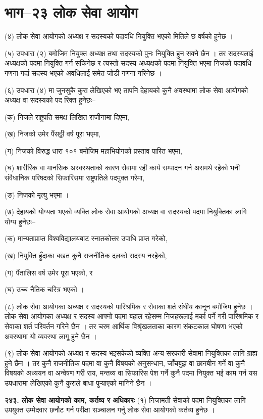 \section{भाग–२३ लोक सेवा आयोग}

(४) लोक सेवा आयोगको अध्यक्ष र सदस्यको पदावधि नियुक्ति भएको मितिले छ वर्षको हुनेछ ।

(५) उपधारा (२) बमोजिम नियुक्त अध्यक्ष तथा सदस्यको पुनः नियुक्ति हुन सक्ने छैन ।
तर सदस्यलाई अध्यक्षको पदमा नियुक्ति गर्न सकिनेछ र त्यस्तो सदस्य अध्यक्षको पदमा नियुक्ति भएमा निजको पदावधि गणना गर्दा सदस्य भएको अवधिलाई समेत जोडी गणना गरिनेछ ।

(६) उपधारा (४) मा जुनसुकै कुरा लेखिएको भए तापनि देहायको कुनै अवस्थामा लोक सेवा आयोगको अध्यक्ष वा सदस्यको पद रिक्त हुनेछः–

(क) निजले राष्ट्रपति समक्ष लिखित राजीनामा दिएमा,

(ख) निजको उमेर पैंसठ्ठी वर्ष पूरा भएमा,

(ग) निजको विरुद्ध धारा १०१ बमोजिम महाभियोगको प्रस्ताव पारित भएमा,

(घ) शारीरिक वा मानसिक अस्वस्थताको कारण सेवामा रही कार्य सम्पादन गर्न असमर्थ रहेको भनी संवैधानिक परिषदको सिफारिसमा राष्ट्रपतिले पदमुक्त गरेमा,

(ङ) निजको मृत्यु भएमा ।

(७) देहायको योग्यता भएको व्यक्ति लोक सेवा आयोगको अध्यक्ष वा सदस्यको पदमा नियुक्तिका लागि योग्य हुनेछः–

(क) मान्यताप्राप्त विश्वविद्यालयबाट स्नातकोत्तर उपाधि प्राप्त गरेको,

(ख) नियुक्ति हुँदाका बखत कुनै राजनीतिक दलको सदस्य नरहेको,

(ग) पैंतालिस वर्ष उमेर पूरा भएको, र

(घ) उच्च नैतिक चरित्र भएको ।

(८) लोक सेवा आयोगका अध्यक्ष र सदस्यको पारिश्रमिक र सेवाका शर्त संघीय कानून बमोजिम हुनेछ । लोक सेवा आयोगका अध्यक्ष र सदस्य आफ्नो पदमा बहाल रहेसम्म निजहरूलाई मर्का पर्ने गरी पारिश्रमिक र सेवाका शर्त परिवर्तन गरिने छैन ।
तर चरम आर्थिक विश्रृंखलताका कारण संकटकाल घोषणा भएको अवस्थामा यो व्यवस्था लागू हुने छैन ।

(९) लोक सेवा आयोगको अध्यक्ष र सदस्य भइसकेको व्यक्ति अन्य सरकारी सेवामा नियुक्तिका लागि ग्राह्य हुने छैन ।
तर कुनै राजनीतिक पदमा वा कुनै विषयको अनुसन्धान, जाँचबुझ वा छानबीन गर्ने वा कुनै विषयको अध्ययन वा अन्वेषण गरी राय, मन्तव्य वा सिफारिस पेश गर्ने कुनै पदमा नियुक्त भई काम गर्न यस उपधारामा लेखिएको कुनै कुराले बाधा पुर्‍याएको मानिने छैन ।

\textbf{२४३. लोक सेवा आयोगको काम, कर्तव्य र अधिकारः} (१) निजामती सेवाको पदमा नियुक्तिका लागि उपयुक्त उम्मेदवार छनौट गर्न परीक्षा सञ्चालन गर्नु लोक सेवा आयोगको कर्तव्य हुनेछ ।

